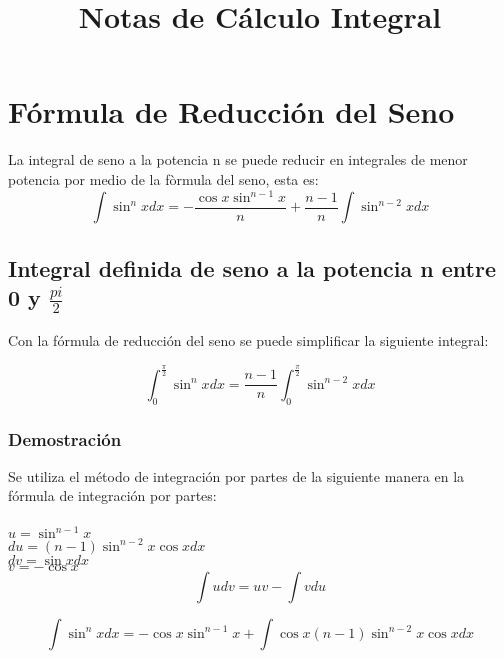 \documentclass[12pt]{article}
\title{Notas de Cálculo Integral}
\begin{document}
\date{}
\maketitle


\section{Fórmula de Reducción del Seno}

\begin{large}
La integral de seno a la potencia n se puede reducir en integrales de menor potencia por medio de la fòrmula del seno, esta es:
\begin{equation}
 \int \sin^n x dx = -\frac{\cos x \sin^{n-1}x}{n} + \frac{n-1}{n}\int \sin^{n-2} xdx 
\end{equation}

\subsection{Integral definida de seno a la potencia n entre 0 y $\displaystyle \frac{pi}{2}$}
Con la fórmula de reducción del seno se puede simplificar la siguiente integral:

\begin{equation}
 \int_0^\frac{\pi}{2} \sin^n x dx = \frac{n-1}{n}\int_0^\frac{\pi}{2} \sin^{n-2} xdx 
\end{equation}

\subsubsection{Demostración}
Se utiliza el método de integración por partes de la siguiente manera en la fórmula de integración por partes:\\
\\
$\displaystyle u = \sin^{n-1} x $ \\
$\displaystyle du = (n-1)\sin^{n-2} x \cos xdx$\\
$\displaystyle dv = \sin xdx $ \\
$\displaystyle v = -\cos x $ \\


\begin{equation}
 \int udv = uv - \int vdu
\end{equation}

\begin{equation}
 \int \sin^n x dx = -\cos x\sin^{n-1} x + \int \cos x(n-1)\sin^{n-2} x \cos xdx
\end{equation}


\end{large}
\end{document}
